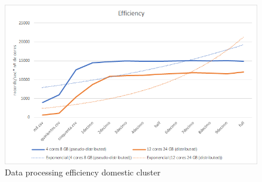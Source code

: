 \begin{figure}[htp!]
	\centering
	\caption{Data processing efficiency domestic cluster}
	\label{epd}
	\vspace{5pt}
	\includegraphics[scale=0.85]{geng/epd}
\end{figure}

